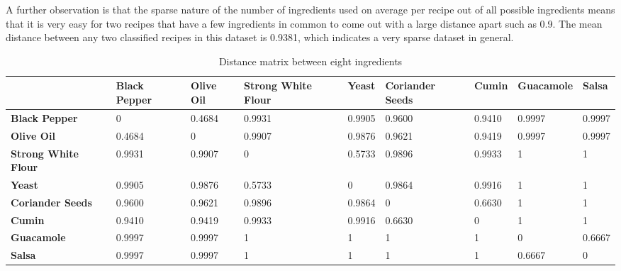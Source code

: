 \documentclass[11pt,a4paper]{article}
\begin{document}
A further observation is that the sparse nature of the number of ingredients used
on average per recipe out of all possible ingredients means that it is very easy for two
recipes that have a few ingredients in common to come out with a large distance apart such
as 0.9. The mean distance between any two classified recipes in this dataset is 0.9381, which
indicates a very sparse dataset in general.

\begin{sidewaystable}
  \centering
  \begin{tabular}{| p{3.8cm} | p{1.5cm} | p{1.5cm} | p{1.5cm} | p{1.3cm} | p{1.9cm} | p{1.3cm} | p{2.1cm} | p{1.3cm} |}
    \hline
    & \textbf{Black Pepper} & \textbf{Olive Oil} & \textbf{Strong White Flour} & \textbf{Yeast}  & \textbf{Coriander Seeds} & \textbf{Cumin}  & \textbf{Guacamole} & \textbf{Salsa}  \\
    \hline
    \textbf{Black Pepper}       & 0            & 0.4684    & 0.9931             & 0.9905 & 0.9600          & 0.9410 & 0.9997    & 0.9997 \\
    \hline
    \textbf{Olive Oil}          & 0.4684       & 0         & 0.9907             & 0.9876 & 0.9621          & 0.9419 & 0.9997    & 0.9997 \\
    \hline
    \textbf{Strong White Flour} & 0.9931       & 0.9907    & 0                  & 0.5733 & 0.9896          & 0.9933 & 1         & 1      \\
    \hline
    \textbf{Yeast}              & 0.9905       & 0.9876    & 0.5733             & 0      & 0.9864          & 0.9916 & 1         & 1      \\
    \hline
    \textbf{Coriander Seeds}    & 0.9600       & 0.9621    & 0.9896             & 0.9864 & 0               & 0.6630 & 1         & 1      \\
    \hline
    \textbf{Cumin}              & 0.9410       & 0.9419    & 0.9933             & 0.9916 & 0.6630          & 0      & 1         & 1      \\
    \hline
    \textbf{Guacamole}          & 0.9997       & 0.9997    & 1                  & 1      & 1               & 1      & 0         & 0.6667 \\
    \hline
    \textbf{Salsa}              & 0.9997       & 0.9997    & 1                  & 1      & 1               & 1      & 0.6667    & 0      \\
    \hline
  \end{tabular}
  \caption{Distance matrix between eight ingredients}
  \label{tab:food-distance-matrix}
\end{sidewaystable}
\end{document}
